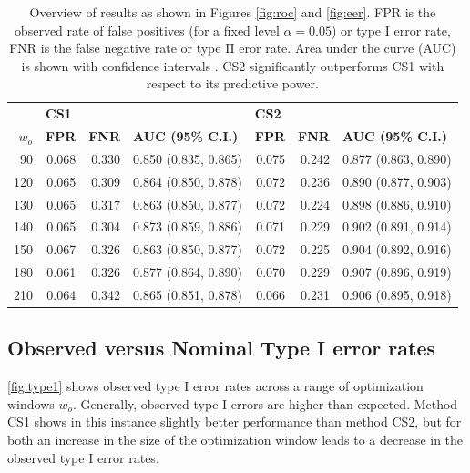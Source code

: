 \documentclass[12pt]{article}
\begin{document}
\begin{table}[ht]
\centering
\begin{adjustbox}{max width=\textwidth}
\begin{tabular}{rrrlrrl}
  \hline
  & \multicolumn{3}{l}{\bf CS1} & \multicolumn{3}{l}{\bf CS2} \\
$w_o$ & \bf FPR & \bf FNR & \bf AUC (95\% C.I.) & \bf FPR & \bf FNR & \bf AUC (95\% C.I.) \\ 
  \hline
90 & 0.068 & 0.330 & 0.850 (0.835, 0.865) & 0.075 & 0.242 & 0.877 (0.863, 0.890) \\ 
  120 & 0.065 & 0.309 & 0.864 (0.850, 0.878) & 0.072 & 0.236 & 0.890 (0.877, 0.903) \\ 
  130 & 0.065 & 0.317 & 0.863 (0.850, 0.877) & 0.072 & 0.224 & 0.898 (0.886, 0.910) \\ 
  140 & 0.065 & 0.304 & 0.873 (0.859, 0.886) & 0.071 & 0.229 & 0.902 (0.891, 0.914) \\ 
  150 & 0.067 & 0.326 & 0.863 (0.850, 0.877) & 0.072 & 0.225 & 0.904 (0.892, 0.916) \\ 
  180 & 0.061 & 0.326 & 0.877 (0.864, 0.890) & 0.070 & 0.229 & 0.907 (0.896, 0.919) \\ 
  210 & 0.064 & 0.342 & 0.865 (0.851, 0.878) & 0.066 & 0.231 & 0.906 (0.895, 0.918) \\ 
   \hline
\end{tabular}
\end{adjustbox}
\caption{\label{tab:aucs} Overview of results as shown in Figures \ref{fig:roc} and \ref{fig:eer}. FPR is the observed rate of false positives (for a fixed level $\alpha = 0.05$) or type I error rate, FNR is the false negative rate or type II eror rate. Area under the curve (AUC) is shown with confidence intervals \citep{delong}. CS2 significantly outperforms CS1 with respect to its predictive power. }
\end{table}

\hypertarget{observed-versus-nominal-type-i-error-rates}{%
\subsection{Observed versus Nominal Type I error
rates}\label{observed-versus-nominal-type-i-error-rates}}

\autoref{fig:type1} shows observed type I error rates across a range of
optimization windows \(w_o\). Generally, observed type I errors are
higher than expected. Method CS1 shows in this instance slightly better
performance than method CS2, but for both an increase in the size of the
optimization window leads to a decrease in the observed type I error
rates.
\end{document}

